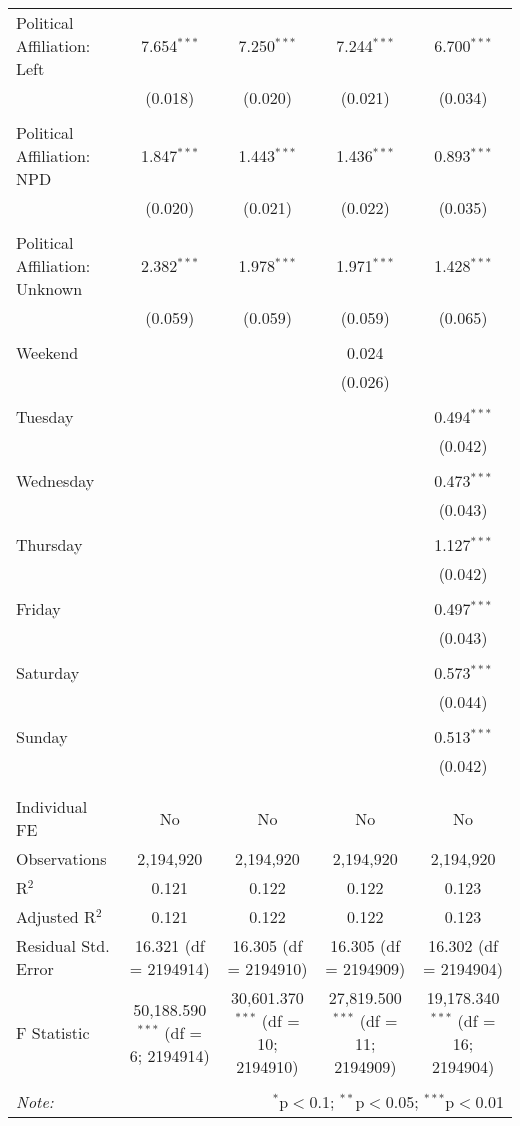 \documentclass[
]{article}
\begin{document}
\begin{table}[!htbp]
{\begin{tabular}{@{\extracolsep{5pt}}lcccc}
 Political Affiliation: Left & 7.654$^{***}$ & 7.250$^{***}$ & 7.244$^{***}$ & 6.700$^{***}$ \\ 
  & (0.018) & (0.020) & (0.021) & (0.034) \\ 
  & & & & \\ 
 Political Affiliation: NPD & 1.847$^{***}$ & 1.443$^{***}$ & 1.436$^{***}$ & 0.893$^{***}$ \\ 
  & (0.020) & (0.021) & (0.022) & (0.035) \\ 
  & & & & \\ 
 Political Affiliation: Unknown & 2.382$^{***}$ & 1.978$^{***}$ & 1.971$^{***}$ & 1.428$^{***}$ \\ 
  & (0.059) & (0.059) & (0.059) & (0.065) \\ 
  & & & & \\ 
 Weekend &  &  & 0.024 &  \\ 
  &  &  & (0.026) &  \\ 
  & & & & \\ 
 Tuesday &  &  &  & 0.494$^{***}$ \\ 
  &  &  &  & (0.042) \\ 
  & & & & \\ 
 Wednesday &  &  &  & 0.473$^{***}$ \\ 
  &  &  &  & (0.043) \\ 
  & & & & \\ 
 Thursday &  &  &  & 1.127$^{***}$ \\ 
  &  &  &  & (0.042) \\ 
  & & & & \\ 
 Friday &  &  &  & 0.497$^{***}$ \\ 
  &  &  &  & (0.043) \\ 
  & & & & \\ 
 Saturday &  &  &  & 0.573$^{***}$ \\ 
  &  &  &  & (0.044) \\ 
  & & & & \\ 
 Sunday &  &  &  & 0.513$^{***}$ \\ 
  &  &  &  & (0.042) \\ 
  & & & & \\ 
\hline \\[-1.8ex] 
Individual FE & No & No & No & No \\ 
Observations & 2,194,920 & 2,194,920 & 2,194,920 & 2,194,920 \\ 
R$^{2}$ & 0.121 & 0.122 & 0.122 & 0.123 \\ 
Adjusted R$^{2}$ & 0.121 & 0.122 & 0.122 & 0.123 \\ 
Residual Std. Error & 16.321 (df = 2194914) & 16.305 (df = 2194910) & 16.305 (df = 2194909) & 16.302 (df = 2194904) \\ 
F Statistic & 50,188.590$^{***}$ (df = 6; 2194914) & 30,601.370$^{***}$ (df = 10; 2194910) & 27,819.500$^{***}$ (df = 11; 2194909) & 19,178.340$^{***}$ (df = 16; 2194904) \\ 
\hline 
\hline \\[-1.8ex] 
\textit{Note:}  & \multicolumn{4}{r}{$^{*}$p$<$0.1; $^{**}$p$<$0.05; $^{***}$p$<$0.01} \\ 
\end{tabular}
} 
\end{table} 
\newpage
\end{document}
